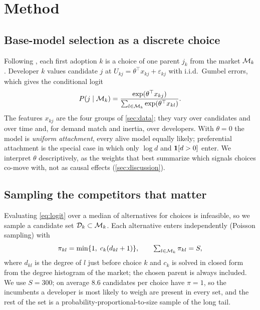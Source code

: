 \section{Method}
\label{sec:method}

\subsection{Base-model selection as a discrete choice}
Following \citet{overgoor2019choosing}, each first adoption $k$ is a choice of one parent $j_k$ from the market
$\mathcal{M}_k$. Developer $k$ values candidate $j$ at $U_{kj} = \theta^\top x_{kj} + \varepsilon_{kj}$ with i.i.d.\ Gumbel
errors, which gives the conditional logit \citep{mcfadden1974conditional}
\begin{equation}
  P(j \mid \mathcal{M}_k) = \frac{\exp(\theta^\top x_{kj})}{\sum_{l \in \mathcal{M}_k} \exp(\theta^\top x_{kl})}.
  \label{eq:logit}
\end{equation}
The features $x_{kj}$ are the four groups of \cref{sec:data}; they vary over candidates and over time and, for
demand match and inertia, over developers. With $\theta = 0$ the model is \emph{uniform attachment}, every
alive model equally likely; preferential attachment is the special case in which only $\log d$ and $\mathbf{1}[d>0]$
enter. We interpret $\theta$ descriptively, as the weights that best summarize which signals choices co-move with,
not as causal effects (\cref{sec:discussion}).

\subsection{Sampling the competitors that matter}
\label{sec:sampling}
Evaluating \eqref{eq:logit} over a median of \marketMedian{} alternatives for \nFirst{} choices is infeasible, so we
sample a candidate set $\mathcal{D}_k \subset \mathcal{M}_k$. Each alternative enters independently (Poisson sampling) with
\begin{equation}
  \pi_{kl} = \min\{1,\; c_k (d_{kl} + 1)\}, \qquad \textstyle\sum_{l \in \mathcal{M}_k} \pi_{kl} = S,
  \label{eq:pps}
\end{equation}
where $d_{kl}$ is the degree of $l$ just before choice $k$ and $c_k$ is solved in closed form from the degree
histogram of the market; the chosen parent is always included. We use $S=300$; on average 8.6 candidates per choice
have $\pi=1$, so the incumbents a developer is most likely to weigh are present in every set, and the rest of the
set is a probability-proportional-to-size sample of the long tail.

